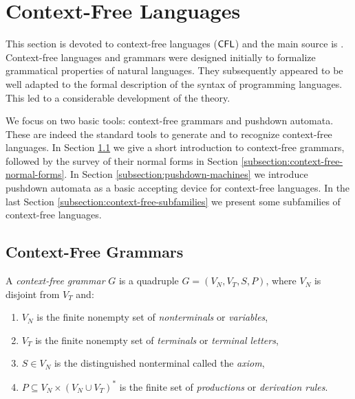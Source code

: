\section{Context-Free Languages}
\label{section:context-free-languages}

This section is devoted to  context-free languages \index{$\CFL$}($\CFL$) and the main source is \cite{AuBeBo1997context-free}. Context-free languages and  grammars were designed  initially to formalize grammatical properties of natural languages. They subsequently appeared to be well adapted to the formal description of the syntax of programming languages. This led to a considerable development of the theory.

We focus on two basic tools: context-free grammars and  pushdown automata. These are indeed the standard tools to generate and to recognize context-free languages. In Section \ref{subsection:context-free-grammars} we give a short introduction to context-free grammars, followed by the survey of their normal forms in Section \ref{subsection:context-free-normal-forms}. In Section \ref{subsection:pushdown-machines} we introduce pushdown automata as a basic accepting device for context-free languages. In the last Section \ref{subsection:context-free-subfamilies} we present some subfamilies of context-free languages.

\subsection{Context-Free Grammars}
\label{subsection:context-free-grammars}

A \emph{context-free grammar} $G$ is a quadruple $G = (V_N, V_T, S, P)$, where $V_N$ is disjoint from $V_T$ and:

\begin{enumerate}[]
\item $V_N$ is the finite nonempty set of \emph{nonterminals} or \emph{variables},
\item $V_T$ is the finite nonempty set of \emph{terminals} or \emph{terminal letters},
\item $S \in V_N$ is the distinguished nonterminal called the \emph{axiom},
\item $P \subseteq V_N \times (V_N \cup V_T)^*$ is the finite set of \emph{productions} or \emph{derivation rules}.
\end{enumerate}

